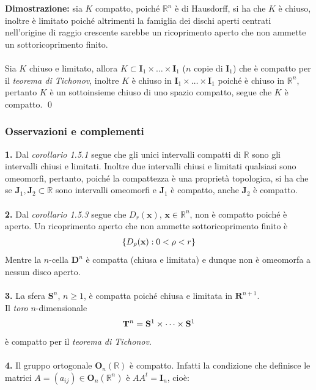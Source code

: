 \documentclass{article}
\begin{document}
\textbf{Dimostrazione:} sia $K$ compatto, poiché $\mathbb{R}^n$ è di Hausdorff, si ha che $K$ è chiuso, inoltre è limitato poiché altrimenti la famiglia dei dischi aperti centrati nell'origine di raggio crescente sarebbe un ricoprimento aperto che non ammette un sottoricoprimento finito. \\ \\
Sia $K$ chiuso e limitato, allora $K \subset \mathbf{I}_1 \times \dots \times \mathbf{I}_1$ ($n$ copie di $\mathbf{I}_1$) che è compatto per il \textit{teorema di Tichonov}, inoltre $K$ è chiuso in $\mathbf{I}_1 \times \dots \times \mathbf{I}_1$ poiché è chiuso in $\mathbb{R}^n$, pertanto $K$ è un sottoinsieme chiuso di uno spazio compatto, segue che $K$ è compatto. \qed
\subsubsection{Osservazioni e complementi}
\textbf{1.} Dal \textit{corollario 1.5.1} segue che gli unici intervalli compatti di $\mathbb{R}$ sono gli intervalli chiusi e limitati. Inoltre due intervalli chiusi e limitati qualsiasi sono omeomorfi, pertanto, poiché la compattezza è una proprietà topologica, si ha che se $\mathbf{J}_1, \mathbf{J}_2 \subset \mathbb{R}$ sono intervalli omeomorfi e $\mathbf{J}_1$ è compatto, anche $\mathbf{J}_2$ è compatto. \\ \\
\textbf{2.} Dal \textit{corollario 1.5.3} segue che $D_r(\mathbf{x})$, $\mathbf{x} \in \mathbb{R}^n$, non è compatto poiché è aperto. Un ricoprimento aperto che non ammette sottoricoprimento finito è
\begin{gather}
    \{ D_\rho (\mathbf{x}) : 0 < \rho < r \} \notag
\end{gather}
Mentre la $n$-cella $\mathbf{D}^n$ è compatta (chiusa e limitata) e dunque non è omeomorfa a nessun disco aperto. \\ \\
\textbf{3.} La sfera $\mathbf{S}^n$, $n \geq 1$, è compatta poiché chiusa e limitata in $\mathbf{R}^{n + 1}$. \\
Il \textit{toro} $n$-dimensionale
\begin{gather}
    \mathbf{T}^n = \mathbf{S}^1 \times \dots \times \mathbf{S}^1 \notag
\end{gather}
è compatto per il \textit{teorema di Tichonov}. \\ \\
\textbf{4.} Il gruppo ortogonale $\mathbf{O}_n(\mathbb{R})$ è compatto. Infatti la condizione che definisce le matrici $A = (a_{ij}) \in \mathbf{O}_n(\mathbb{R}^n)$ è $AA^t = \mathbf{I}_n$, cioè:
\end{document}
